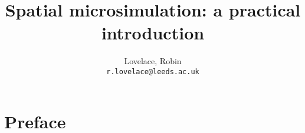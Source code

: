 \documentclass[a5paper, 11pt, twoside]{book}  %
\begin{document}
 
\title{Spatial microsimulation: a practical introduction}
\pagestyle{myheadings}
\author{Lovelace, Robin\\
\texttt{r.lovelace@leeds.ac.uk}}
\maketitle

\tableofcontents

\chapter{Preface}

% 
% 
\end{document}
